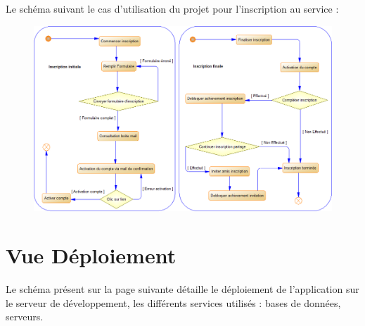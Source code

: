 \documentclass{life-fr}
\begin{document}
\newpage

Le schéma suivant le cas d'utilisation du projet pour l'inscription au service :
\begin{figure}[H]
  \begin{center}
    \includegraphics[width=17cm]{img/processus_detailles.png}
  \end{center}
\end{figure}


\chapter{Vue Déploiement}

Le schéma présent sur la page suivante détaille le déploiement de l'application sur le serveur de développement, les différents services utilisés : bases de données, serveurs.

\newpage
\end{document}
